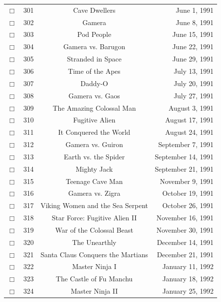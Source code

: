 \documentclass[12pt]{article}
\begin{document}
\begin{center}
\begin{longtable}[c]{cccr}
\\  %
$\Box$&301&Cave Dwellers&June  1, 1991\\
$\Box$&302&Gamera&June  8, 1991\\
$\Box$&303&Pod People&June 15, 1991\\
$\Box$&304&Gamera vs. Barugon&June 22, 1991\\
$\Box$&305&Stranded in Space&June 29, 1991\\
$\Box$&306&Time of the Apes&July 13, 1991\\
$\Box$&307&Daddy-O&July 20, 1991\\
$\Box$&308&Gamera vs. Gaos&July 27, 1991\\
$\Box$&309&The Amazing Colossal Man&August  3, 1991\\
$\Box$&310&Fugitive Alien&August 17, 1991\\
$\Box$&311&It Conquered the World&August 24, 1991\\
$\Box$&312&Gamera vs. Guiron&September  7, 1991\\
$\Box$&313&Earth vs. the Spider&September 14, 1991\\
$\Box$&314&Mighty Jack&September 21, 1991\\
$\Box$&315&Teenage Cave Man&November  9, 1991\\
$\Box$&316&Gamera vs. Zigra&October 19, 1991\\
$\Box$&317&Viking Women and the Sea Serpent&October 26, 1991\\
$\Box$&318&Star Force: Fugitive Alien II&November 16, 1991\\
$\Box$&319&War of the Colossal Beast&November 30, 1991\\
$\Box$&320&The Unearthly&December 14, 1991\\
$\Box$&321&Santa Claus Conquers the Martians&December 21, 1991\\
$\Box$&322&Master Ninja I&January 11, 1992\\
$\Box$&323&The Castle of Fu Manchu&January 18, 1992\\
$\Box$&324&Master Ninja II&January 25, 1992\\  %


\end{longtable}
\end{center}
\end{document}
